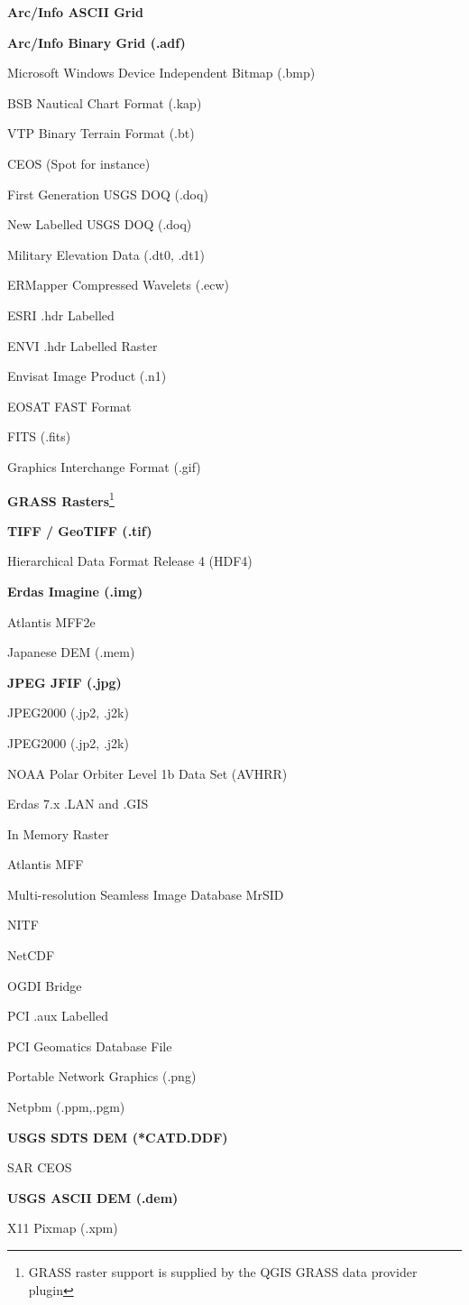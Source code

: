 \documentclass[10pt,english]{article}
\begin{document}
\begin{onehalfspace}
\begin{compactitem}
\item \textbf{Arc/Info ASCII Grid}
\item \textbf{Arc/Info Binary Grid (.adf)}
\item Microsoft Windows Device Independent Bitmap (.bmp)
\item BSB Nautical Chart Format (.kap)
\item VTP Binary Terrain Format (.bt)
\item CEOS (Spot for instance)
\item First Generation USGS DOQ (.doq)
\item New Labelled USGS DOQ (.doq)
\item Military Elevation Data (.dt0, .dt1)
\item ERMapper Compressed Wavelets (.ecw)
\item ESRI .hdr Labelled
\item ENVI .hdr Labelled Raster
\item Envisat Image Product (.n1)
\item EOSAT FAST Format
\item FITS (.fits)
\item Graphics Interchange Format (.gif)
\item \textbf{GRASS Rasters}\footnote{GRASS raster support is supplied by the QGIS GRASS data provider plugin} 
\item \textbf{TIFF / GeoTIFF (.tif)}
\item Hierarchical Data Format Release 4 (HDF4)
\item \textbf{Erdas Imagine (.img)}
\item Atlantis MFF2e
\item Japanese DEM (.mem)
\item \textbf{JPEG JFIF (.jpg)}
\item JPEG2000 (.jp2, .j2k)
\item JPEG2000 (.jp2, .j2k)
\item NOAA Polar Orbiter Level 1b Data Set (AVHRR)
\item Erdas 7.x .LAN and .GIS
\item In Memory Raster
\item Atlantis MFF
\item Multi-resolution Seamless Image Database  MrSID
\item NITF
\item NetCDF
\item OGDI Bridge
\item PCI .aux Labelled
\item PCI Geomatics Database File
\item Portable Network Graphics (.png)
\item Netpbm (.ppm,.pgm)
\item \textbf{USGS SDTS DEM (*CATD.DDF)}
\item SAR CEOS
\item \textbf{USGS ASCII DEM (.dem)}
\item X11 Pixmap (.xpm)

\end{compactitem}

\end{onehalfspace}
\end{document}
